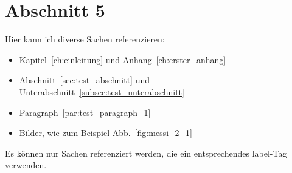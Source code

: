 

\section{Abschnitt 5}\label{sec:abschnitt_5}

Hier kann ich diverse Sachen referenzieren:

\begin{itemize}
    \item Kapitel~\ref{ch:einleitung} und Anhang~\ref{ch:erster_anhang}
    \item Abschnitt~\ref{sec:test_abschnitt} und Unterabschnitt~\ref{subsec:test_unterabschnitt}
    \item Paragraph~\ref{par:test_paragraph_1}
    \item Bilder, wie zum Beispiel Abb.~\ref{fig:messi_2_1}
\end{itemize}

Es können nur Sachen referenziert werden, die ein entsprechendes label-Tag verwenden.
